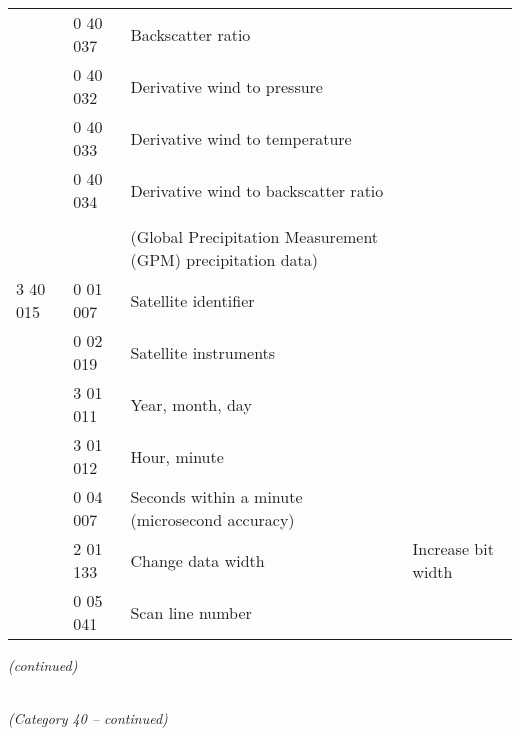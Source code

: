 \begin{longtable}[]{@{}llll@{}}
& 0 40 037 & Backscatter ratio &\tabularnewline
& 0 40 032 & Derivative wind to pressure &\tabularnewline
& 0 40 033 & Derivative wind to temperature &\tabularnewline
& 0 40 034 & Derivative wind to backscatter ratio &\tabularnewline
& & &\tabularnewline
& & (Global Precipitation Measurement (GPM) precipitation data) &\tabularnewline
3 40 015 & 0 01 007 & Satellite identifier &\tabularnewline
& 0 02 019 & Satellite instruments &\tabularnewline
& 3 01 011 & Year, month, day &\tabularnewline
& 3 01 012 & Hour, minute &\tabularnewline
& 0 04 007 & Seconds within a minute (microsecond accuracy) &\tabularnewline
& 2 01 133 & Change data width & Increase bit width\tabularnewline
& 0 05 041 & Scan line number &\tabularnewline
\bottomrule
\end{longtable}

\emph{(continued)}

\emph{\\
(Category 40 -- continued)}

